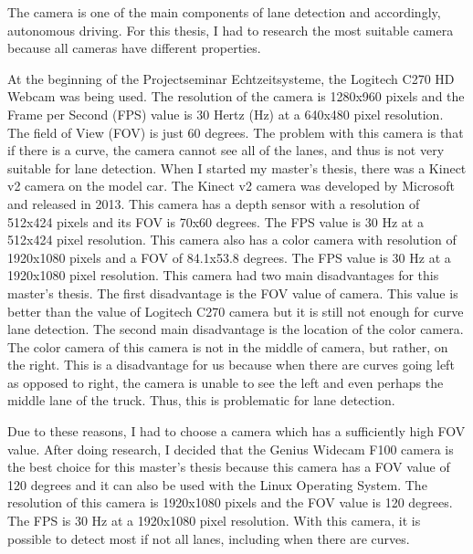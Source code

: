 The camera is one of the main components of lane detection and accordingly, autonomous driving. For this thesis, I had 
to research the most suitable camera because all cameras have different properties.

At the beginning of the Projectseminar Echtzeitsysteme, the Logitech C270 HD Webcam was being used. The resolution of 
the camera is 1280x960 pixels and the Frame per Second (FPS) value is 30 Hertz (Hz) at a 640x480 pixel resolution. 
The field of View (FOV) is just 60 degrees. The problem with this camera is that if there is a curve, the camera 
cannot see all of the lanes, and thus is not very suitable for lane detection. When I started my master's thesis, there 
was a Kinect v2 camera on the model car.  The Kinect v2 camera was developed by Microsoft and released in 2013. This 
camera has a depth sensor with a resolution of 512x424 pixels and its FOV is 70x60 degrees. The FPS value is 30 Hz at 
a 512x424 pixel resolution. This camera also has a color camera with resolution of 1920x1080 pixels and a FOV of 
84.1x53.8 degrees. The FPS value is 30 Hz at a 1920x1080 pixel resolution. This camera had two main disadvantages for 
this master's thesis. The first disadvantage is the FOV value of camera. This value is better than the value of Logitech 
C270 camera but it is still not enough for curve lane detection. The second main disadvantage is the location of the 
color camera. The color camera of this camera is not in the middle of camera, but rather, on the right. This is a 
disadvantage for us because when there are curves going left as opposed to right, the camera is unable to see the 
left and even perhaps the middle lane of the truck. Thus, this is problematic for lane detection.

Due to these reasons, I had to choose a camera which has a sufficiently high FOV value. After doing research, I decided 
that the Genius Widecam F100 camera is the best choice for this master's thesis because this camera has a FOV value of 
120 degrees and it can also be used with the Linux Operating System. The resolution of this camera is 1920x1080 pixels 
and the FOV value is 120 degrees. The FPS is 30 Hz at a 1920x1080 pixel resolution. With this camera, it is possible 
to detect most if not all lanes, including when there are curves. 

